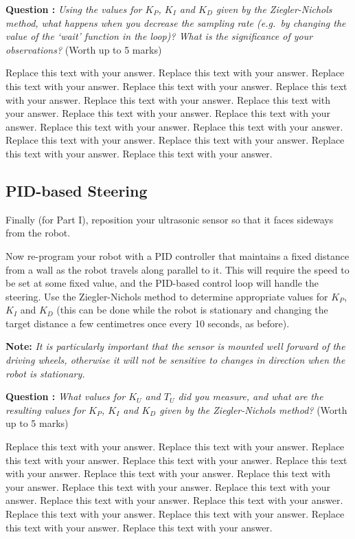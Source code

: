 \documentclass[hidelinks,a4paper,11pt]{article}
\newcounter{question}
\newcommand\myq{\refstepcounter{question}\thequestion}
\begin{document}
{\bfseries Question \myq:}  \emph{Using the values for $K_P$, $K_I$ and $K_D$ given by the Ziegler-Nichols method, what happens when you decrease the sampling rate (e.g.\ by changing the value of the `wait' function in the loop)?  What is the significance of your observations?} (Worth up to 5 marks)\\
\begin{mdframed}
Replace this text with your answer.  Replace this text with your answer.  Replace this text with your answer.  Replace this text with your answer.  Replace this text with your answer.  Replace this text with your answer.  Replace this text with your answer.  Replace this text with your answer.  Replace this text with your answer.  Replace this text with your answer.  Replace this text with your answer.  Replace this text with your answer.  Replace this text with your answer.  Replace this text with your answer.  Replace this text with your answer.
\end{mdframed}
\vspace*{\baselineskip}


\subsection{PID-based Steering}

Finally (for Part I), reposition your ultrasonic sensor so that it faces sideways from the robot.

Now re-program your robot with a PID controller that maintains a fixed distance from a wall as the robot travels along parallel to it.  This will require the speed to be set at some fixed value, and the PID-based control loop will handle the steering.  Use the Ziegler-Nichols method to determine appropriate values for $K_P$, $K_I$ and $K_D$ (this can be done while the robot is stationary and changing the target distance a few centimetres once every 10 seconds, as before).

{\bfseries Note:}  \emph{It is particularly important that the sensor is mounted well forward of the driving wheels, otherwise it will not be sensitive to changes in direction when the robot is stationary.}

{\bfseries Question \myq:}  \emph{What values for $K_U$ and $T_U$ did you measure, and what are the resulting values for $K_P$, $K_I$ and $K_D$  given by the Ziegler-Nichols method?} (Worth up to 5 marks)\\
\begin{mdframed}
Replace this text with your answer.  Replace this text with your answer.  Replace this text with your answer.  Replace this text with your answer.  Replace this text with your answer.  Replace this text with your answer.  Replace this text with your answer.  Replace this text with your answer.  Replace this text with your answer.  Replace this text with your answer.  Replace this text with your answer.  Replace this text with your answer.  Replace this text with your answer.  Replace this text with your answer.  Replace this text with your answer.
\end{mdframed}
\vspace*{\baselineskip}
\end{document}
